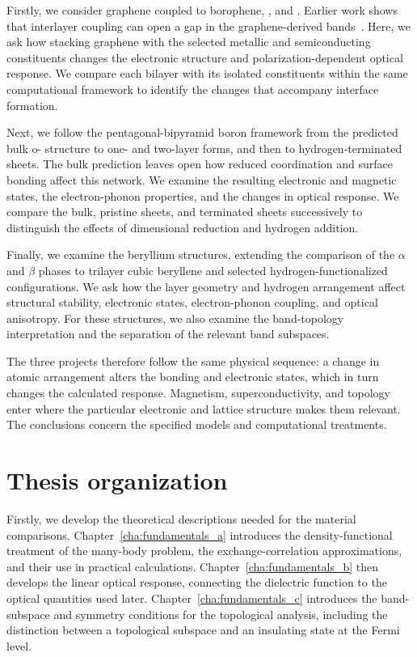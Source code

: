 Firstly, we consider graphene coupled to borophene, , and .
Earlier work shows that interlayer coupling can open a gap in the graphene-derived bands~\cite{li2014tunable}.
Here, we ask how stacking graphene with the selected metallic and semiconducting constituents changes the electronic structure and polarization-dependent optical response.
We compare each bilayer with its isolated constituents within the same computational framework to identify the changes that accompany interface formation.

Next, we follow the pentagonal-bipyramid boron framework from the predicted bulk o- structure to one- and two-layer forms, and then to hydrogen-terminated sheets.
The bulk prediction leaves open how reduced coordination and surface bonding affect this network.
We examine the resulting electronic and magnetic states, the electron-phonon properties, and the changes in optical response.
We compare the bulk, pristine sheets, and terminated sheets successively to distinguish the effects of dimensional reduction and hydrogen addition.

Finally, we examine the beryllium structures, extending the comparison of the $\alpha$ and $\beta$ phases to trilayer cubic beryllene and selected hydrogen-functionalized configurations.
We ask how the layer geometry and hydrogen arrangement affect structural stability, electronic states, electron-phonon coupling, and optical anisotropy.
For these structures, we also examine the band-topology interpretation and the separation of the relevant band subspaces.

The three projects therefore follow the same physical sequence: a change in atomic arrangement alters the bonding and electronic states, which in turn changes the calculated response.
Magnetism, superconductivity, and topology enter where the particular electronic and lattice structure makes them relevant.
The conclusions concern the specified models and computational treatments.

\FloatBarrier
\section{Thesis organization}
\label{sec:intro_organisation}

Firstly, we develop the theoretical descriptions needed for the material comparisons.
Chapter~\ref{cha:fundamentals_a} introduces the density-functional treatment of the many-body problem, the exchange-correlation approximations, and their use in practical calculations.
Chapter~\ref{cha:fundamentals_b} then develops the linear optical response, connecting the dielectric function to the optical quantities used later.
Chapter~\ref{cha:fundamentals_c} introduces the band-subspace and symmetry conditions for the topological analysis, including the distinction between a topological subspace and an insulating state at the Fermi level.

